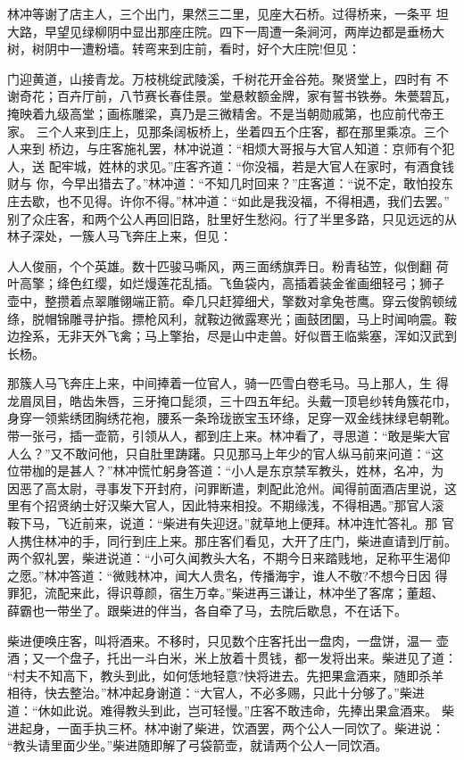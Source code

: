 林冲等谢了店主人，三个出门，果然三二里，见座大石桥。过得桥来，一条平
坦大路，早望见绿柳阴中显出那座庄院。四下一周遭一条涧河，两岸边都是垂杨大
树，树阴中一遭粉墙。转弯来到庄前，看时，好个大庄院!但见：

门迎黄道，山接青龙。万枝桃绽武陵溪，千树花开金谷苑。聚贤堂上，四时有
不谢奇花；百卉厅前，八节赛长春佳景。堂悬敕额金牌，家有誓书铁券。朱甍碧瓦，
掩映着九级高堂；画栋雕梁，真乃是三微精舍。不是当朝勋戚第，也应前代帝王
家。
三个人来到庄上，见那条阔板桥上，坐着四五个庄客，都在那里乘凉。三个人来到
桥边，与庄客施礼罢，林冲说道：“相烦大哥报与大官人知道：京师有个犯人，送
配牢城，姓林的求见。”庄客齐道：“你没福，若是大官人在家时，有酒食钱财与
你，今早出猎去了。”林冲道：“不知几时回来？”庄客道：“说不定，敢怕投东
庄去歇，也不见得。许你不得。”林冲道：“如此是我没福，不得相遇，我们去罢。”
别了众庄客，和两个公人再回旧路，肚里好生愁闷。行了半里多路，只见远远的从
林子深处，一簇人马飞奔庄上来，但见：

人人俊丽，个个英雄。数十匹骏马嘶风，两三面绣旗弄日。粉青毡笠，似倒翻
荷叶高擎；绛色红缨，如烂熳莲花乱插。飞鱼袋内，高插着装金雀画细轻弓；狮子
壶中，整攒着点翠雕翎端正箭。牵几只赶獐细犬，擎数对拿兔苍鹰。穿云俊鹘顿绒
绦，脱帽锦雕寻护指。摽枪风利，就鞍边微露寒光；画鼓团圞，马上时闻响震。鞍
边拴系，无非天外飞禽；马上擎抬，尽是山中走兽。好似晋王临紫塞，浑如汉武到
长杨。

那簇人马飞奔庄上来，中间捧着一位官人，骑一匹雪白卷毛马。马上那人，生
得龙眉凤目，皓齿朱唇，三牙掩口髭须，三十四五年纪。头戴一顶皂纱转角簇花巾，
身穿一领紫绣团胸绣花袍，腰系一条玲珑嵌宝玉环绦，足穿一双金线抹绿皂朝靴。
带一张弓，插一壶箭，引领从人，都到庄上来。林冲看了，寻思道：“敢是柴大官
人么？”又不敢问他，只自肚里踌躇。只见那马上年少的官人纵马前来问道：“这
位带枷的是甚人？”林冲慌忙躬身答道：“小人是东京禁军教头，姓林，名冲，为
因恶了高太尉，寻事发下开封府，问罪断遣，刺配此沧州。闻得前面酒店里说，这
里有个招贤纳士好汉柴大官人，因此特来相投。不期缘浅，不得相遇。”那官人滚
鞍下马，飞近前来，说道：“柴进有失迎迓。”就草地上便拜。林冲连忙答礼。那
官人携住林冲的手，同行到庄上来。那庄客们看见，大开了庄门，柴进直请到厅前。
两个叙礼罢，柴进说道：“小可久闻教头大名，不期今日来踏贱地，足称平生渴仰
之愿。”林冲答道：“微贱林冲，闻大人贵名，传播海宇，谁人不敬?不想今日因
得罪犯，流配来此，得识尊颜，宿生万幸。”柴进再三谦让，林冲坐了客席；董超、
薛霸也一带坐了。跟柴进的伴当，各自牵了马，去院后歇息，不在话下。

柴进便唤庄客，叫将酒来。不移时，只见数个庄客托出一盘肉，一盘饼，温一
壶酒；又一个盘子，托出一斗白米，米上放着十贯钱，都一发将出来。柴进见了道：
“村夫不知高下，教头到此，如何恁地轻意?快将进去。先把果盒酒来，随即杀羊
相待，快去整治。”林冲起身谢道：“大官人，不必多赐，只此十分够了。”柴进
道：“休如此说。难得教头到此，岂可轻慢。”庄客不敢违命，先捧出果盒酒来。
柴进起身，一面手执三杯。林冲谢了柴进，饮酒罢，两个公人一同饮了。柴进说：
“教头请里面少坐。”柴进随即解了弓袋箭壶，就请两个公人一同饮酒。

